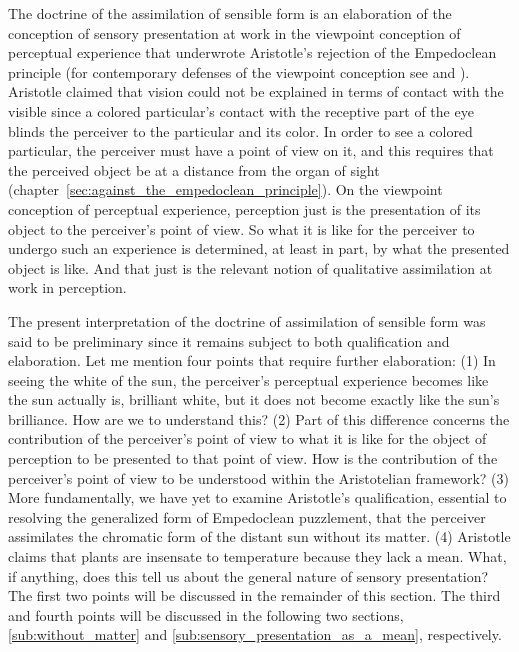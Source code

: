 The doctrine of the assimilation of sensible form is an elaboration of the conception of sensory presentation at work in the viewpoint conception of perceptual experience that underwrote Aristotle's rejection of the Empedoclean principle (for contemporary defenses of the viewpoint conception see \citealt{Martin:1998nx} and \citealt{Kalderon:2011fk}). Aristotle claimed that vision could not be explained in terms of contact with the visible since a colored particular's contact with the receptive part of the eye blinds the perceiver to the particular and its color. In order to see a colored particular, the perceiver must have a point of view on it, and this requires that the perceived object be at a distance from the organ of sight (chapter~\ref{sec:against_the_empedoclean_principle}). On the viewpoint conception of perceptual experience, perception just is the presentation of its object to the perceiver's point of view. So what it is like for the perceiver to undergo such an experience is determined, at least in part, by what the presented object is like. And that just is the relevant notion of qualitative assimilation at work in perception.

The present interpretation of the doctrine of assimilation of sensible form was said to be preliminary since it remains subject to both qualification and elaboration. Let me mention four points that require further elaboration: (1) In seeing the white of the sun, the perceiver's perceptual experience becomes like the sun actually is, brilliant white, but it does not become exactly like the sun's brilliance. How are we to understand this? (2) Part of this difference concerns the contribution of the perceiver's point of view to what it is like for the object of perception to be presented to that point of view. How is the contribution of the perceiver's point of view to be understood within the Aristotelian framework? (3) More fundamentally, we have yet to examine Aristotle's qualification, essential to resolving the generalized form of Empedoclean puzzlement, that the perceiver assimilates the chromatic form of the distant sun without its matter. (4) Aristotle claims that plants are insensate to temperature because they lack a mean. What, if anything, does this tell us about the general nature of sensory presentation? The first two points will be discussed in the remainder of this section. The third and fourth points will be discussed in the following two sections, \ref{sub:without_matter} and \ref{sub:sensory_presentation_as_a_mean}, respectively.

